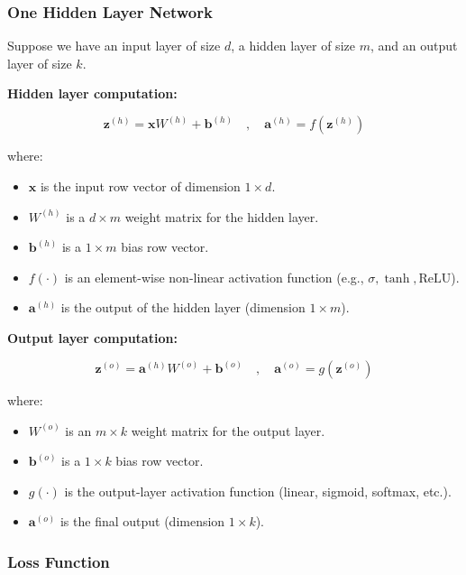 \documentclass{article}
\begin{document}
\subsubsection{One Hidden Layer Network}

Suppose we have an input layer of size $d$, a hidden layer of size $m$, and an output layer of size $k$.

\textbf{Hidden layer computation:}

\[
\mathbf{z}^{(h)} = \mathbf{x} W^{(h)} + \mathbf{b}^{(h)}
\quad,\quad
\mathbf{a}^{(h)} = f(\mathbf{z}^{(h)})
\]

where:
\begin{itemize}
    \item $\mathbf{x}$ is the input row vector of dimension $1 \times d$.
    \item $W^{(h)}$ is a $d \times m$ weight matrix for the hidden layer.
    \item $\mathbf{b}^{(h)}$ is a $1 \times m$ bias row vector.
    \item $f(\cdot)$ is an element-wise non-linear activation function (e.g., $\sigma, \tanh, \mathrm{ReLU}$).
    \item $\mathbf{a}^{(h)}$ is the output of the hidden layer (dimension $1 \times m$).
\end{itemize}

\textbf{Output layer computation:}

\[
\mathbf{z}^{(o)} = \mathbf{a}^{(h)} W^{(o)} + \mathbf{b}^{(o)}
\quad,\quad
\mathbf{a}^{(o)} = g(\mathbf{z}^{(o)})
\]

where:
\begin{itemize}
    \item $W^{(o)}$ is an $m \times k$ weight matrix for the output layer.
    \item $\mathbf{b}^{(o)}$ is a $1 \times k$ bias row vector.
    \item $g(\cdot)$ is the output-layer activation function (linear, sigmoid, softmax, etc.).
    \item $\mathbf{a}^{(o)}$ is the final output (dimension $1 \times k$).
\end{itemize}

\subsubsection{Loss Function}
\end{document}
